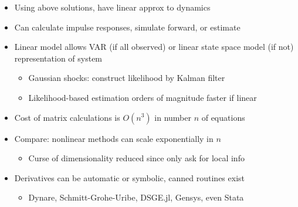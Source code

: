 \documentclass[bigger,handout]{beamer}
\begin{document}
\begin{frame}

\begin{itemize}

\item Using above solutions, have linear approx to dynamics
\item Can calculate impulse responses, simulate forward, or estimate
\item Linear model allows VAR (if all observed) or linear state space model (if not) representation of system
  \begin{itemize}
  \item Gaussian shocks: construct likelihood by Kalman filter
  \item Likelihood-based estimation orders of magnitude faster if linear
  \end{itemize}
\item Cost of matrix calculations is $O(n^3)$ in number $n$ of equations
\item Compare: nonlinear methods can scale exponentially in $n$
  \begin{itemize}
  \item Curse of dimensionality reduced since only ask for local info
  \end{itemize}
\item Derivatives can be automatic or symbolic, canned routines exist
  \begin{itemize}
  \item Dynare, Schmitt-Grohe-Uribe, DSGE.jl, Gensys, even Stata
  \end{itemize}

\end{itemize}

\end{frame}%
\end{document}
